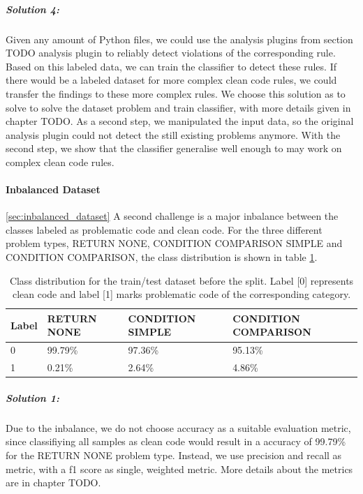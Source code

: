 \subparagraph{Solution 4:}
Given any amount of Python files, we could use the analysis plugins from section TODO analysis plugin to reliably detect violations of the corresponding rule. Based on this labeled data, we can train the classifier to detect these rules. If there would be a labeled dataset for more complex clean code rules, we could transfer the findings to these more complex rules. We choose this solution as to solve to solve the dataset problem and train classifier, with more details given in chapter TODO. As a second step, we manipulated the input data, so the original analysis plugin could not detect the still existing problems anymore. With the second step, we show that the classifier generalise well enough to may work on complex clean code rules.

\paragraph{Inbalanced Dataset}\ref{sec:inbalanced_dataset}
A second challenge is a major inbalance between the classes labeled as problematic code and clean code. For the three different problem types, RETURN NONE, CONDITION COMPARISON SIMPLE and CONDITION COMPARISON, the class distribution is shown in table \ref{tab:class_distribution_in_dataset}.



\begin{table}[]
    \begin{tabular}{@{}llll@{}}
    \toprule
    Label  & RETURN NONE & CONDITION SIMPLE & CONDITION COMPARISON \\ \midrule
    0 & 99.79\%     & 97.36\%          & 95.13\%              \\
    1 & 0.21\%      & 2.64\%           & 4.86\%               \\ \bottomrule
    \end{tabular}
    \caption{Class distribution for the train/test dataset before the split. Label [0] represents clean code and label [1] marks problematic code of the corresponding category.}
    \label{tab:class_distribution_in_dataset}
    \end{table}


\subparagraph{Solution 1:}
Due to the inbalance, we do not choose accuracy as a suitable evaluation metric, since classifiying all samples as clean code would result in a accuracy of 99.79\% for the RETURN NONE problem type. Instead, we use precision and recall as metric, with a f1 score as single, weighted metric. More details about the metrics are in chapter TODO.

